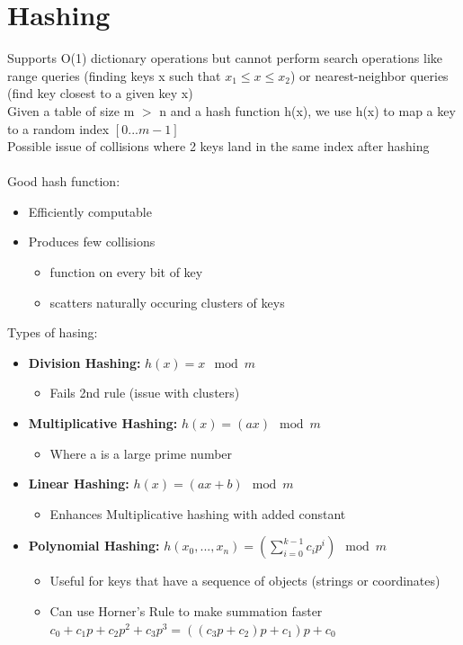 \documentclass{article}
\begin{document}
  \section{Hashing}
  Supports O(1) dictionary operations but cannot perform search operations like range queries (finding keys x such that $x_{1} \leq x \leq x_{2}$) or nearest-neighbor queries (find key closest to a given key x)\\
  Given a table of size m $>$ n and a hash function h(x), we use h(x) to map a key to a random index $[0...m-1]$ \\
  Possible issue of collisions where 2 keys land in the same index after hashing\\ \\
  Good hash function:
  \begin{itemize}[noitemsep]
  \item Efficiently computable
  \item Produces few collisions
    \begin{itemize}[noitemsep]
      \item function on every bit of key 
      \item scatters naturally occuring clusters of keys \\
    \end{itemize}
  \end{itemize}
  Types of hasing:
  \begin{itemize}[noitemsep]
    \item \textbf{Division Hashing: }$h(x) = x \mod m$
    \begin{itemize}[noitemsep]
      \item Fails 2nd rule (issue with clusters)
    \end{itemize}
  \item \textbf{Multiplicative Hashing: }$h(x) = (ax) \mod m$
  \begin{itemize}
    \item Where a is a large prime number
  \end{itemize}
\item \textbf{Linear Hashing: }$h(x) = (ax + b) \mod m$
  \begin{itemize}
      \item Enhances Multiplicative hashing with added constant
  \end{itemize}
\item \textbf{Polynomial Hashing: }$h(x_{0}, ..., x_{n}) = (\sum_{i=0}^{k-1}c_{i}p^{i}) \mod m$
    \begin{itemize}
      \item Useful for keys that have a sequence of objects (strings or coordinates)
      \item Can use Horner's Rule to make summation faster $c_{0} + c_{1}p + c_{2}p^{2} + c_{3}p^{3} = ((c_{3}p + c_{2})p + c_{1})p + c_{0}$ \\
    \end{itemize}
  \end{itemize}
\end{document}
